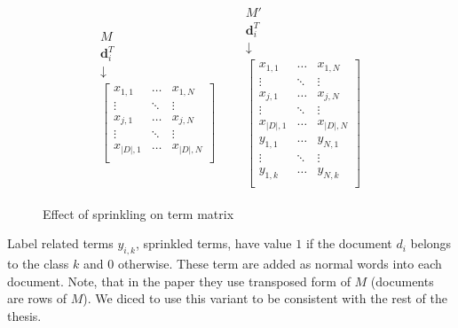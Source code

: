 \begin{figure}[h]
\centering
    \begin{equation*}
\begin{matrix} 
\begin{matrix} 
M  \\
\textbf{d}_i^T  \\
\downarrow \\
\begin{bmatrix}
x_{1,1}& \dots&  x_{1,N} \\
\vdots &  \ddots & \vdots \\
x_{j,1}& \dots & x_{j,N} \\
\vdots & \ddots & \vdots \\
x_{|D|,1} &\dots&  x_{|D|,N} \\
\end{bmatrix}
\end{matrix}
&
&
\begin{matrix} 
M'  \\
\textbf{d}_i^T  \\
\downarrow \\
\begin{bmatrix}
x_{1,1}& \dots&  x_{1,N} \\
\vdots &  \ddots & \vdots \\
x_{j,1}& \dots & x_{j,N} \\
\vdots & \ddots & \vdots \\
x_{|D|,1} &\dots&  x_{|D|,N} \\
\hline 
y_{1,1} &\dots&  y_{N,1} \\
\vdots & \ddots & \vdots \\
y_{1,k} &\dots&  y_{N,k} \\

\end{bmatrix}
\end{matrix}
\end{matrix}
\end{equation*}

\caption{Effect of sprinkling on term matrix}\label{fig:animals}
\end{figure}

    Label related terms $y_{i,k}$, sprinkled terms, have value $1$ if the document $d_i$ belongs to the class $k$ and $0$ otherwise.
    These term are added as normal words into each document.
    Note, that in the paper they use transposed form of $M$ (documents are rows of $M$).
    We diced to use this variant to be consistent with the rest of the thesis.
    
